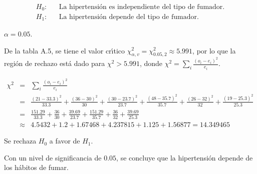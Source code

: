 \begin{solucion}
 \begin{hipotesis}
  \begin{eqnarray*}
   H_0: & & \text{La hipertensi\'on es independiente del tipo de fumador.} \\
   H_1: & & \text{La hipertensi\'on depende del tipo de fumador.}
  \end{eqnarray*}
 \end{hipotesis}

 \begin{significancia}
  $\alpha = 0.05$.
 \end{significancia}

 \begin{region}
  De la tabla A.5, se tiene el valor cr\'{\i}tico
  $\chi^2_{\alpha,v} = \chi^2_{0.05,2} \approx 5.991$,
  por lo que la regi\'on de rechazo est\'a dado
  para $\chi^2 > 5.991$, donde
  $\chi^2 = \sum_{i} \frac{\left( o_i - e_i \right)^2}{e_i}$.
 \end{region}

 \begin{estadistico}
  \begin{eqnarray*}
   \chi^2 & = & \sum_{i} \frac{\left( o_i - e_i \right)^2}{e_i} \\
   & = & \frac{(21 - 33.3)^2}{33.3} + \frac{(36 - 30)^2}{30} +
   \frac{(30 - 23.7)^2}{23.7} + \frac{(48 - 35.7)^2}{35.7} + 
   \frac{(26 - 32)^2}{32} + \frac{(19 - 25.3)^2}{25.3} \\
   & = & \frac{151.29}{33.3} + \frac{36}{30} + \frac{39.69}{23.7} + 
   \frac{151.29}{35.7} + \frac{36}{32} + \frac{39.69}{25.3} \\
   & \approx & 4.5432 + 1.2 + 1.67468 + 4.237815 + 1.125 + 1.56877
   = 14.349465
  \end{eqnarray*}
 \end{estadistico}

 \begin{decision}
  Se rechaza $H_0$ a favor de $H_1$.
 \end{decision}

 \begin{conclusion}
  Con un nivel de significancia de $0.05$, se concluye
  que la hipertensi\'on depende de los h\'abitos de fumar.
 \end{conclusion}


\end{solucion}

